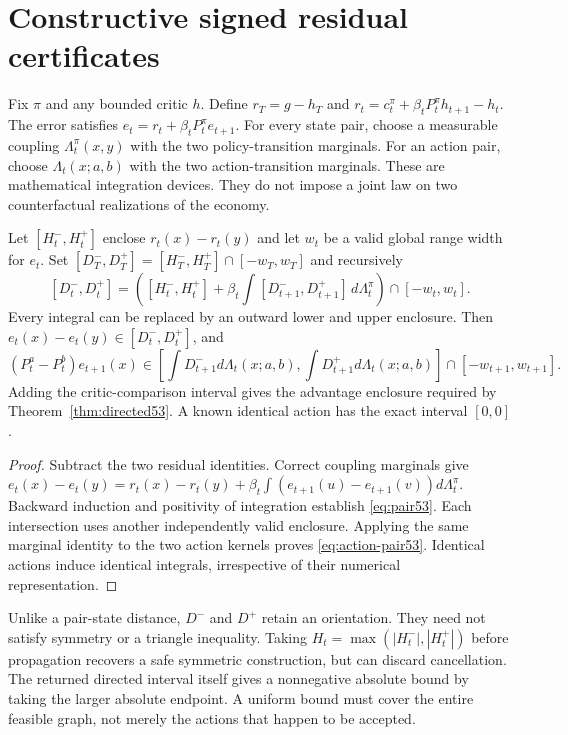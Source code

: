 \section{Constructive signed residual certificates}\label{sec:coupled53}
Fix $\pi$ and any bounded critic $h$. Define $r_T=g-h_T$ and
$r_t=c_t^\pi+\beta_tP_t^\pi h_{t+1}-h_t$. The error satisfies $e_t=r_t+\beta_tP_t^\pi e_{t+1}$. For every state pair, choose a measurable coupling $\Lambda_t^\pi(x,y)$ with the two policy-transition marginals. For an action pair, choose $\Lambda_t(x;a,b)$ with the two action-transition marginals. These are mathematical integration devices. They do not impose a joint law on two counterfactual realizations of the economy.

\begin{proposition}\label{prop:transport53}
Let $[H_t^-,H_t^+]$ enclose $r_t(x)-r_t(y)$ and let $w_t$ be a valid global range width for $e_t$. Set $[D_T^-,D_T^+]=[H_T^-,H_T^+]\cap[-w_T,w_T]$ and recursively
\begin{equation}\label{eq:pair53}
 [D_t^-,D_t^+]=
 \left([H_t^-,H_t^+]+\beta_t
       \int[D_{t+1}^-,D_{t+1}^+]\,d\Lambda_t^\pi\right)
       \cap[-w_t,w_t].
\end{equation}
Every integral can be replaced by an outward lower and upper enclosure. Then $e_t(x)-e_t(y)\in[D_t^-,D_t^+]$, and
\begin{equation}\label{eq:action-pair53}
 (P_t^a-P_t^b)e_{t+1}(x)\in
 \left[\int D_{t+1}^-d\Lambda_t(x;a,b),
       \int D_{t+1}^+d\Lambda_t(x;a,b)\right]\cap[-w_{t+1},w_{t+1}].
\end{equation}
Adding the critic-comparison interval gives the advantage enclosure required by Theorem~\ref{thm:directed53}. A known identical action has the exact interval $[0,0]$.
\end{proposition}
\begin{proof}
Subtract the two residual identities. Correct coupling marginals give
$e_t(x)-e_t(y)=r_t(x)-r_t(y)+\beta_t\int(e_{t+1}(u)-e_{t+1}(v))d\Lambda_t^\pi$.
Backward induction and positivity of integration establish \eqref{eq:pair53}. Each intersection uses another independently valid enclosure. Applying the same marginal identity to the two action kernels proves \eqref{eq:action-pair53}. Identical actions induce identical integrals, irrespective of their numerical representation.
\end{proof}

Unlike a pair-state distance, $D^-$ and $D^+$ retain an orientation. They need not satisfy symmetry or a triangle inequality. Taking $H_t=\max(|H_t^-|,|H_t^+|)$ before propagation recovers a safe symmetric construction, but can discard cancellation. The returned directed interval itself gives a nonnegative absolute bound by taking the larger absolute endpoint. A uniform bound must cover the entire feasible graph, not merely the actions that happen to be accepted.

